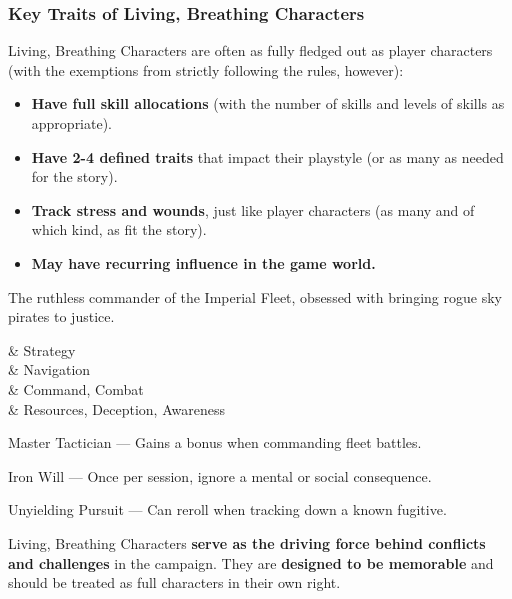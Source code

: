 \subsubsection{Key Traits of Living, Breathing Characters}
Living, Breathing Characters are often as fully fledged out as player characters (with the exemptions from strictly following the rules, however):
\begin{itemize}
    \item \textbf{Have full skill allocations} (with the number of skills and levels of skills as appropriate).
    \item \textbf{Have 2-4 defined traits} that impact their playstyle (or as many as needed for the story).
    \item \textbf{Track stress and wounds}, just like player characters (as many and of which kind, as fit the story).
    \item \textbf{May have recurring influence in the game world.}
\end{itemize}

\begin{WyrdExample}
	The ruthless commander of the Imperial Fleet, obsessed with bringing rogue sky pirates to justice.
  
	\vspace{0.5\baselineskip}

	\begin{SkillsBox}
		\Superior & Strategy \\
		\Expert & Navigation \\
		\Skilled & Command, Combat \\
		\Novice & Resources, Deception, Awareness \\
	\end{SkillsBox}

	\begin{TraitsBox}
	  \item[Master Tactician] — Gains a bonus when commanding fleet battles.
	  \item[Iron Will] — Once per session, ignore a mental or social consequence.
	  \item[Unyielding Pursuit] — Can reroll when tracking down a known fugitive.
	\end{TraitsBox}
  
	\DamageBox
\end{WyrdExample}
  

Living, Breathing Characters \textbf{serve as the driving force behind conflicts and challenges} in the campaign. They are \textbf{designed to be memorable} and should be treated as full characters in their own right.

